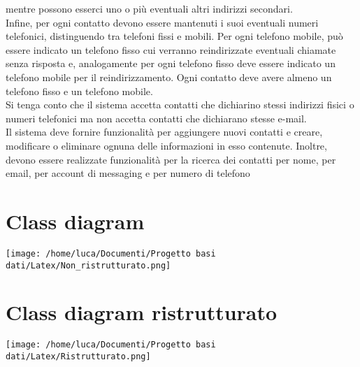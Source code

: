 \documentclass{article}
\begin{document}
    mentre possono esserci uno o più eventuali altri indirizzi secondari.
    \\Infine, per ogni contatto devono essere mantenuti i suoi eventuali numeri telefonici, distinguendo tra telefoni
    fissi e mobili. Per ogni telefono mobile, può essere indicato un telefono fisso cui verranno reindirizzate
    eventuali chiamate senza risposta e, analogamente per ogni telefono fisso deve essere indicato un telefono
    mobile per il reindirizzamento. Ogni contatto deve avere almeno un telefono fisso e un telefono mobile.
    \\Si tenga conto che il sistema accetta contatti che dichiarino stessi indirizzi fisici o numeri telefonici ma non
    accetta contatti che dichiarano stesse e-mail.
    \\Il sistema deve fornire funzionalità per aggiungere nuovi contatti e creare, modificare o eliminare ognuna
    delle informazioni in esso contenute. Inoltre, devono essere realizzate funzionalità per la ricerca dei
    contatti per nome, per email, per account di messaging e per numero di telefono

    \section{\LARGE Class diagram}
    \texttt{[image: /home/luca/Documenti/Progetto basi dati/Latex/Non\_ristrutturato.png]}
   

    \section{\LARGE Class diagram ristrutturato}
    \texttt{[image: /home/luca/Documenti/Progetto basi dati/Latex/Ristrutturato.png]}
\end{document}
